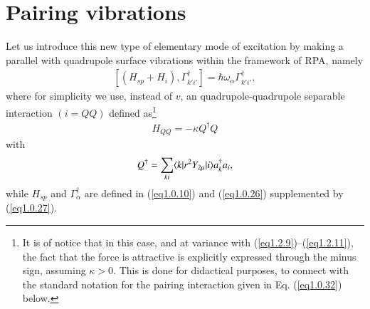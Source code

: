 \section{Pairing vibrations}\label{Sect1.3}
Let us introduce this new type of elementary mode of excitation by making a parallel with quadrupole surface vibrations within the framework of RPA, namely
\begin{align}\label{eq1.0.29}
\left[(H_{sp}+H_i),\Gamma_{k'i'}^\dagger\right]=\hbar\omega_\alpha\Gamma_{k'i'}^\dagger,
\end{align}
where for simplicity we use, instead of $v$, an quadrupole-quadrupole separable interaction $(i=QQ)$ defined as\footnote{It is of notice that in this case, and at variance with (\ref{eq1.2.9})--(\ref{eq1.2.11}), the fact that the force is attractive is explicitly expressed through the minus sign, assuming $\kappa>0$. This is done for didactical purposes, to connect with the standard notation for the pairing interaction given in Eq. (\ref{eq1.0.32}) below.}
\begin{align}\label{eq1.0.30}
H_{QQ}=-\kappa Q^\dagger Q
\end{align}
with 
\begin{align}\label{eq1.0.31}
 Q^\dagger=\sum_{ki}\langle {k|r^2 Y_{2\mu}|i} \rangle a^\dagger_k a_i,
\end{align}
while $H_{sp}$ and $\Gamma^\dagger_\alpha$ are defined in (\ref{eq1.0.10}) and (\ref{eq1.0.26}) supplemented by (\ref{eq1.0.27}).


